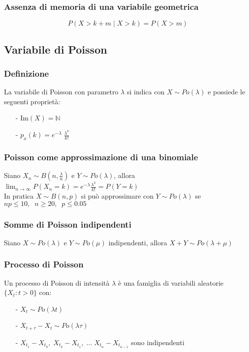 \documentclass[a4paper]{article}
\begin{document}
\subsubsection*{Assenza di memoria di una variabile geometrica}
\[P(X > k + m \;| \;X > k) = P( X > m)\]

\subsection{Variabile di Poisson}
\subsubsection*{Definizione}
La variabile di Poisson con parametro \(\lambda\) si indica con \(X \sim Po(\lambda)\) e possiede le seguenti proprietà:
\begin{itemize}[topsep=3pt, itemsep=0pt]
	\item[-] \(\text{Im}(X) = \mathbb{N}\)
	\item[-] \(\displaystyle p_x(k) = e^{-\lambda} \; \frac{\lambda^k}{k!}\)
\end{itemize}

\subsubsection*{Poisson come approssimazione di una binomiale}
Siano \(X_n \sim B(n, \frac{\lambda}{n})\) e \(Y \sim Po(\lambda)\), allora \(\displaystyle \lim_{n \to \infty} P(X_n = k) = e^{-\lambda} \frac{\lambda^k}{k!} = P(Y = k)\) \\[5pt]
In pratica \(X \sim B(n,p)\) si può approssimare con \(Y \sim Po(\lambda)\) se \(np \leq 10, \;\; n \geq 20, \;\; p \leq 0.05\)

\subsubsection*{Somme di Poisson indipendenti}
Siano \(X \sim Po(\lambda)\) e \(Y \sim Po(\mu)\) indipendenti, allora \(X + Y \sim Po(\lambda + \mu)\)

\subsubsection*{Processo di Poisson}
Un processo di Poisson di intensità \(\lambda\) è una famiglia di variabili aleatorie \(\{X_t : t > 0\}\) con:
\begin{itemize}[topsep=3pt, itemsep=0pt]
	\item[-] \(X_t \sim Po(\lambda t)\)
	\item[-] \(X_{t+\tau} - X_t \sim Po(\lambda \tau)\)
	\item[-] \(X_{t_1} - X_{t_0}, \; X_{t_2} - X_{t_1}, \; \dots \; X_{t_n} - X_{t_{n-1}}\) sono indipendenti
\end{itemize}
\end{document}
